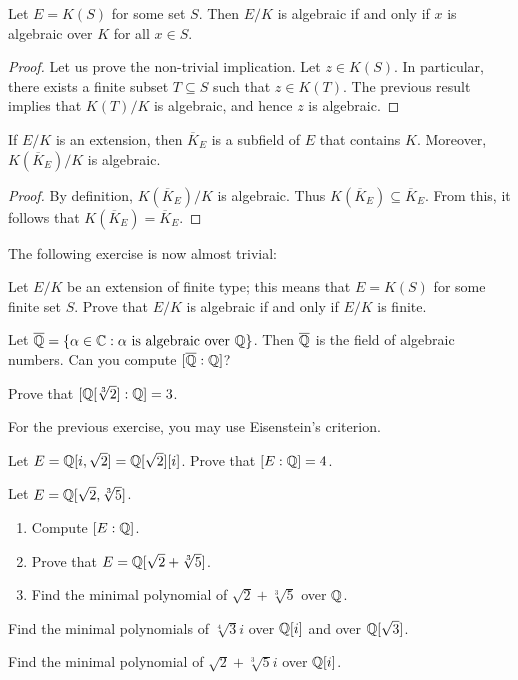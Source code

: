 \begin{corollary}
	Let $E=K(S)$ for some set $S$. Then $E/K$ is algebraic if and only if
	$x$ is algebraic over $K$ for all $x\in S$. 
\end{corollary}

\begin{proof}
	Let us prove the non-trivial implication. Let $z\in K(S)$. In particular, 
	there exists a finite subset $T\subseteq S$ such that 
	$z\in K(T)$. The previous result implies that $K(T)/K$ is algebraic, and
	hence $z$ is algebraic. 
\end{proof}

\begin{corollary}
	If $E/K$ is  an extension, then $\overline{K}_E$ 
	is a subfield of $E$ that contains $K$. Moreover, 
	$K(\overline{K}_E)/K$ is algebraic. 
\end{corollary}	

\begin{proof}
    By definition, $K(\overline{K}_E)/K$ is algebraic. 
    Thus $K(\overline{K}_E)\subseteq\overline{K}_E$. From this, it follows that
    $K(\overline{K}_E)=\overline{K}_E$. 
\end{proof}

The following exercise is now almost trivial:

\begin{exercise}
    Let $E/K$ be an extension of finite type; this means 
    that  
    $E=K(S)$ for some finite
    set $S$.  
    Prove that $E/K$ is algebraic if and only if $E/K$ 
    is finite. 
\end{exercise}

Let $\overline{\mathbb{Q}}=\{\alpha\in\mathbb{C}:\alpha\text{ is algebraic over }\mathbb{Q}\}$. 
Then $\overline{\mathbb{Q}}$ is the field of algebraic numbers. 
Can you compute $[\overline{\mathbb{Q}}:\mathbb{Q}]$?

\begin{exercise}
    Prove that $[\mathbb{Q}[\sqrt[3]{2}]:\mathbb{Q}]=3$. 
\end{exercise}

For the previous exercise, you may use Eisenstein's criterion. 

\begin{exercise}
    Let $E=\mathbb{Q}[i,\sqrt{2}]=\mathbb{Q}[\sqrt{2}][i]$. Prove that $[E:\mathbb{Q}]=4$.  
\end{exercise}

\begin{exercise}
    Let $E=\mathbb{Q}[\sqrt{2},\sqrt[3]{5}]$. 
    \begin{enumerate}
        \item Compute $[E:\mathbb{Q}]$.
        \item Prove that $E=\mathbb{Q}[\sqrt{2}+\sqrt[3]{5}]$.
        \item Find the minimal polynomial of $\sqrt{2}+\sqrt[3]{5}$ over $\mathbb{Q}$. 
    \end{enumerate}
\end{exercise}

\begin{exercise}
    Find the minimal polynomials of $\sqrt[4]{3}i$ over $\mathbb{Q}[i]$ and over $\mathbb{Q}[\sqrt{3}]$. 
\end{exercise}

\begin{exercise}
    Find the minimal polynomial of $\sqrt{2}+\sqrt[3]{5}i$ over $\mathbb{Q}[i]$.
\end{exercise}